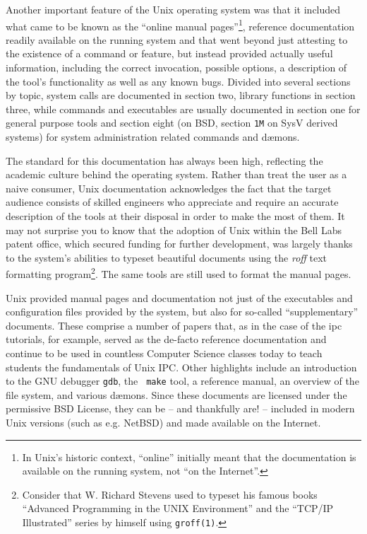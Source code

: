 Another important feature of the Unix operating system
was that it included what came to be known as the
``online manual pages''\footnote{In Unix's historic context,
``online'' initially meant that the documentation is
available on the running system, not ``on the
Internet''.}, reference documentation readily
available on the running system and that went beyond
just attesting to the existence of a command or
feature, but instead provided actually useful
information, including the correct invocation,
possible options, a description of the tool's
functionality as well as any known bugs.  Divided into
several sections by topic,  system calls are
documented in section two, library functions in
section three, while commands and executables are
usually documented in section one for general purpose
tools and section eight (on BSD, section {\tt 1M} on
SysV derived systems) for system administration
related commands and d\ae mons.

The standard for this documentation has always been
high, reflecting the academic culture behind the
operating system.  Rather than treat the user as a
naive consumer, Unix documentation acknowledges the
fact that the target audience consists of skilled
engineers who appreciate and require an accurate
description of the tools at their disposal in order to
make the most of them.  It may not surprise you to
know that the adoption of Unix within the Bell
Labs patent office, which
secured funding for further development, was largely
thanks to the system's abilities to typeset beautiful
documents using the {\em roff} text formatting
program\footnote{Consider that W. Richard
Stevens used to
typeset his famous books ``Advanced Programming in the
UNIX Environment'' and the ``TCP/IP Illustrated''
series by himself using {\tt groff(1)}.}.  The same
tools are still used to format the manual pages.

Unix provided manual pages and documentation not just
of the executables and configuration files provided by
the system, but also for so-called ``supplementary''
documents.  These comprise a number of papers that,
as in the case of the \gls{ipc} tutorials,
for example, served as the de-facto reference
documentation and continue to be used in countless
Computer Science classes today to teach students the
fundamentals of Unix IPC.  Other highlights include an
introduction to the GNU debugger {\tt gdb}, the {\tt
make} tool, a  reference manual, an
overview of the file system, and various d\ae mons.
Since these documents are licensed under the
permissive  BSD License, they can
be -- and thankfully are! -- included in modern Unix
versions (such as e.g. NetBSD) and made
available on the Internet\cite{history:nbsd-docs}.

